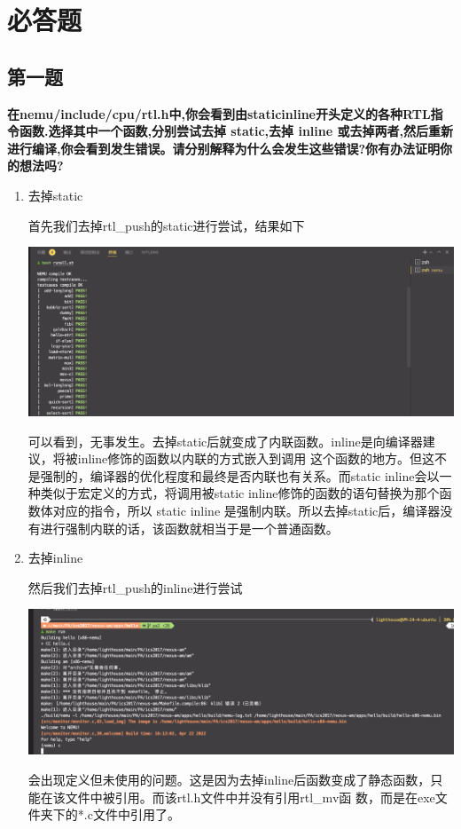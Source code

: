 \documentclass[UTF8,a4paper,10pt]{ctexart}
\begin{document}
\section{必答题}
\subsection{第一题}
\textbf{在nemu/include/cpu/rtl.h中,你会看到由staticinline开头定义的各种RTL指令函数.选择其中一个函数,分别尝试去掉 static,去掉 inline 或去掉两者,然后重新进行编译,你会看到发生错误。请分别解释为什么会发生这些错误?你有办法证明你的想法吗?}
\begin{enumerate}
  \item 去掉static
  
  首先我们去掉rtl\_push的static进行尝试，结果如下
  \begin{center}
    \includegraphics*[scale = 0.25]{ahh}
  \end{center}
  可以看到，无事发生。去掉static后就变成了内联函数。inline是向编译器建议，将被inline修饰的函数以内联的方式嵌入到调用 这个函数的地方。但这不是强制的，编译器的优化程度和最终是否内联也有关系。而static inline会以一 种类似于宏定义的方式，将调用被static inline修饰的函数的语句替换为那个函数体对应的指令，所以 static inline 是强制内联。所以去掉static后，编译器没有进行强制内联的话，该函数就相当于是一个普通函数。
  \item 去掉inline
  
  然后我们去掉rtl\_push的inline进行尝试
  \begin{center}
    \includegraphics*[scale = 0.25]{pupu}
  \end{center}
  会出现定义但未使用的问题。这是因为去掉inline后函数变成了静态函数，只能在该文件中被引用。而该rtl.h文件中并没有引用rtl\_mv函 数，而是在exe文件夹下的*.c文件中引用了。


\end{enumerate}
\end{document}

